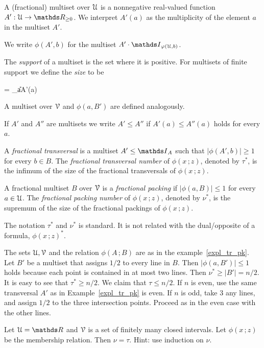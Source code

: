 \documentclass[scombinatorics.tex]{subfiles}
\begin{document}
A (fractional) multiset over $\EuScript U$ is a nonnegative real-valued function $A':\U\to\RR_{\ge0}$.
We interpret $A'(a)$ as the multiplicity of the element $a$ in the multiset $A'$.

We write $\phi(A',b)$ for the multiset $A'\cdot\Indicator_{\phi(\U,b)}$.

The \emph{support\/} of a multiset is the set where it is positive.
For multisets of finite support we define the \emph{size\/} to be\smallskip 

{=}
{\sum_{a\in\U}A'(a)}

A multiset over $\EuScript V$ and $\phi(a,B')$ are defined analogously.
 
If $A'$ and $A''$ are multisets we write $A'\le A''$ if $A'(a)\le A''(a)$ holds for every $a$.

A \emph{fractional transversal\/} is a multiset $A'\le\Indicator_A$ such that $|\phi(A', b)|\ge1$ for every $b\in B$.
The \emph{fractional transversal number\/} of $\phi(x\,;z)$, denoted by $\tau^*$, is the  infimum of the size of the fractional transversals of $\phi(x\,;z)$.

A fractional multiset $B$ over $\EuScript V$ is a \emph{fractional packing\/} if $|\phi(a,B)|\le1$ for every $a\in\EuScript U$.
The \emph{fractional packing number\/} of $\phi(x\,;z)$, denoted by $\nu^*$, is the supremum of the size of the fractional packings of $\phi(x\,;z)$.

The notation $\tau^*$ and $\nu^*$ is standard. 
It is not related with the dual/opposite of a formula, $\phi(x\,;z)^*$. 

\begin{example}
  The sets $\EuScript U,\EuScript V$ and the relation $\phi(A\,;B)$ are as in the example~\ref{expl_tr_pk}.
  Let $B'$ be a multiset that assigns $1/2$ to every line in $B$. Then $|\phi(a,B')|\le1$ holds because each point is contained in at most two lines.
  Then $\nu^*\ge |B'|=n/2$.
  It is easy to see that $\tau^*\ge n/2$.
  We claim that $\tau\le n/2$.
  If $n$ is even, use the same transversal $A'$ as in Example~\ref{expl_tr_pk} is even.
  If $n$ is odd, take $3$ any lines, and assign $1/2$ to the three intersection points.
  Proceed as in the even case with the other lines.\QED
\end{example}

\begin{exercise}
Let $\U=\RR$ and $\EuScript V$ is a set of finitely many closed intervals.
Let $\phi(x\,;z)$ be the membership relation.
Then $\nu=\tau$.
Hint: use induction on $\nu$.\QED
\end{exercise}
\end{document}
